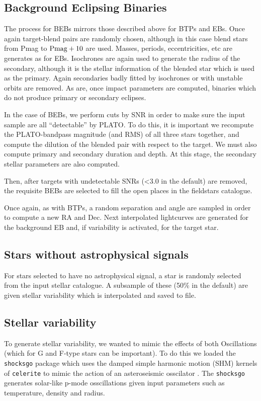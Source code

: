 \documentclass{article}
\begin{document}
\subsection{Background Eclipsing Binaries}

The process for BEBs mirrors those described above for BTPs and EBs.
Once again target-blend pairs are randomly chosen, although in this case blend stars from Pmag to ${\rm Pmag}+10$ are used.
Masses, periods, eccentricities, etc are generates as for EBs.
Isochrones are  again used to generate the radius of the secondary, although it is the stellar information of the blended star which is used as the primary.
Again secondaries badly fitted by isochrones or with unstable orbits are removed. As are, once impact parameters are computed, binaries which do not produce primary or secondary eclipses.

In the case of BEBs, we perform cuts by SNR in order to make sure the input sample are all “detectable” by PLATO. 
To do this, it is important we recompute the PLATO-bandpass magnitude (and RMS) of all three stars together, and compute the dilution of the blended pair with respect to the target.
We must also compute primary and secondary duration and depth.
At this stage, the secondary stellar parameters are also computed.

Then, after targets with undetectable SNRs (<3.0 in the default) are removed, the requisite BEBs are selected to fill the open places in the fieldstars catalogue.

Once again, as with BTPs, a random separation and angle are sampled in order to compute a new RA and Dec.
Next interpolated lightcurves are generated for the background EB and, if variability is activated, for the target star.

\subsection{Stars without astrophysical signals}
For stars selected to have no astrophysical signal, a star is randomly selected from the input stellar catalogue.
A subsample of these (50\% in the default) are given stellar variability which is interpolated and saved to file.

\subsection{Stellar variability}\label{var}
To generate stellar variability, we wanted to mimic the effects of both Oscillations (which for G and F-type stars can be important).
To do this we loaded the \texttt{shocksgo} package which uses the damped simple harmonic motion (SHM) kernels of \texttt{celerite} to mimic the action of an asteroseismic osscilator \citep{foreman2018scalable}.
The \texttt{shocksgo} generates solar-like p-mode osscillations given input parameters such as temperature, density and radius. 
\end{document}
